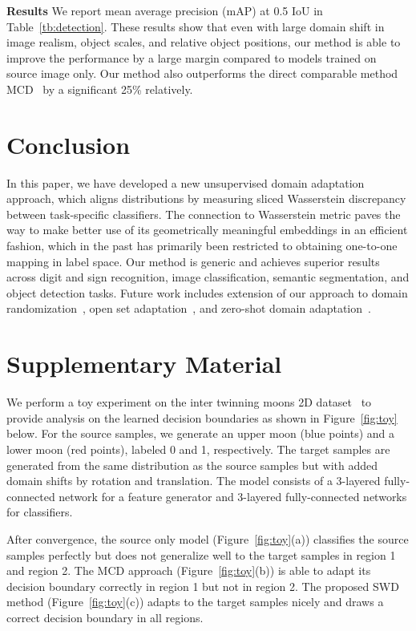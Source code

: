 \documentclass[10pt,twocolumn,letterpaper]{article}
\begin{document}
\vspace{2mm}
\noindent \textbf{Results}
We report mean average precision (mAP) at 0.5 IoU in Table~\ref{tb:detection}. These results show that even with large domain shift in image realism, object scales, and relative object positions, our method is able to improve the performance by a large margin compared to models trained on source image only. Our method also outperforms the direct comparable method MCD~\cite{saito2017maximum} by a significant 25\% relatively.


\section{Conclusion}
In this paper, we have developed a new unsupervised domain adaptation approach, which aligns distributions by measuring sliced Wasserstein discrepancy between task-specific classifiers. The connection to Wasserstein metric paves the way to make better use of its geometrically meaningful embeddings in an efficient fashion, which in the past has primarily been restricted to obtaining one-to-one mapping in label space. Our method is generic and achieves superior results across digit and sign recognition, image classification, semantic segmentation, and object detection tasks. Future work includes extension of our approach to domain randomization~\cite{sundermeyer2018implicit}, open set adaptation~\cite{saito2018open}, and zero-shot domain adaptation~\cite{peng2018zero}.


{\small


}

\section*{Supplementary Material}
\vspace{-1mm}
We perform a toy experiment on the inter twinning moons 2D dataset~\cite{pedregosa2011scikit} to provide analysis on the learned decision boundaries as shown in Figure~\ref{fig:toy} below.
For the source samples, we generate an upper moon (blue points) and a lower moon (red points), labeled 0 and 1, respectively. The target samples are generated from the same distribution as the source samples but with added domain shifts by rotation and translation. The model consists of a 3-layered fully-connected network for a feature generator and 3-layered fully-connected networks for classifiers.

After convergence, the source only model (Figure~\ref{fig:toy}{\color{red}(a)}) classifies the source samples perfectly but does not generalize well to the target samples in region 1 and region 2.
The MCD approach (Figure~\ref{fig:toy}{\color{red}(b)}) is able to adapt its decision boundary correctly in region 1 but not in region 2.
The proposed SWD method (Figure~\ref{fig:toy}{\color{red}(c)}) adapts to the target samples nicely and draws a correct decision boundary in all regions.
\end{document}
